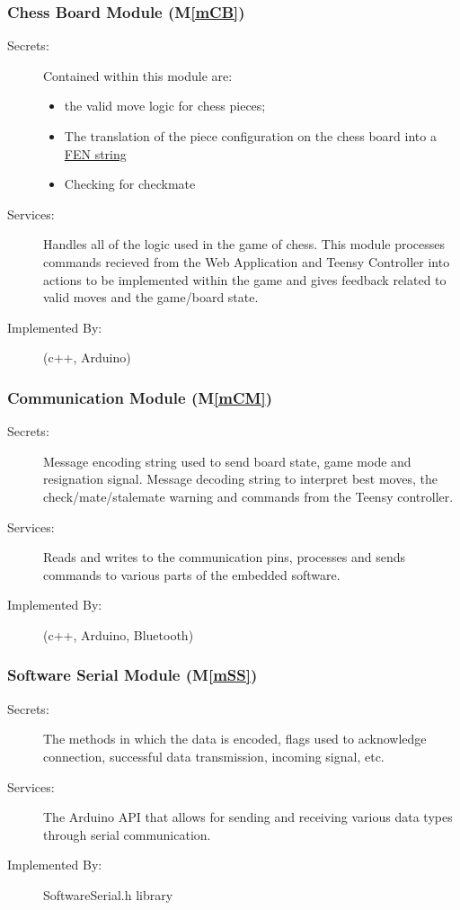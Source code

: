 \documentclass[12pt, titlepage]{article}
\newcommand{\mref}[1]{M\ref{#1}}
\begin{document}
\subsubsection{Chess Board Module (\mref{mCB})}
\begin{description}
\item[Secrets:] Contained within this module are: 
  \begin{itemize}
    \item the valid move logic for chess pieces; 
    \item The translation of the piece configuration on the chess board into a \href{https://en.wikipedia.org/wiki/Forsyth%E2%80%93Edwards_Notation}{FEN string} \item Checking for checkmate
  \end{itemize}
\item[Services:] Handles all of the logic used in the game of chess. This module processes commands recieved from the Web Application and Teensy Controller into actions to be implemented within the game and gives feedback related to valid moves and the game/board state.
\item[Implemented By:] \progname (c++, Arduino)
\end{description}

\subsubsection{Communication Module (\mref{mCM})}
\begin{description}
\item[Secrets:] Message encoding string used to send board state, game mode and resignation signal. Message decoding string to interpret best moves, the check/mate/stalemate warning and commands from the Teensy controller.
\item[Services:] Reads and writes to the communication pins, processes and sends commands to various parts of the embedded software.
\item[Implemented By:] \progname (c++, Arduino, Bluetooth)
\end{description}

\subsubsection{Software Serial Module (\mref{mSS})}
\begin{description}
\item[Secrets:] The methods in which the data is encoded, flags used to acknowledge connection, successful data transmission, incoming signal, etc.
\item[Services:] The Arduino API that allows for sending and receiving various data types through serial communication.
\item[Implemented By:] SoftwareSerial.h library
\end{description}
\end{document}
